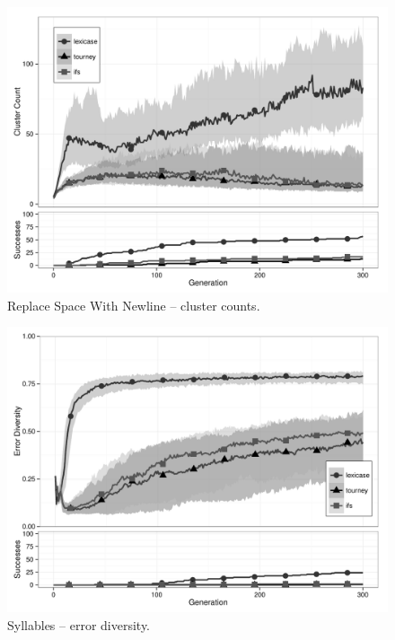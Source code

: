 \begin{figure}[p] %
\centering
\includegraphics[width=11.5cm]{replace-space-with-newline-cluster.pdf}
\caption{Replace Space With Newline -- cluster counts.}
\label{rswnClu}
\end{figure}

\begin{figure}[p] %
\centering
\includegraphics[width=11.5cm]{syllables-diversity.pdf}
\caption{Syllables -- error diversity.}
\label{syllablesDiv}
\end{figure}


